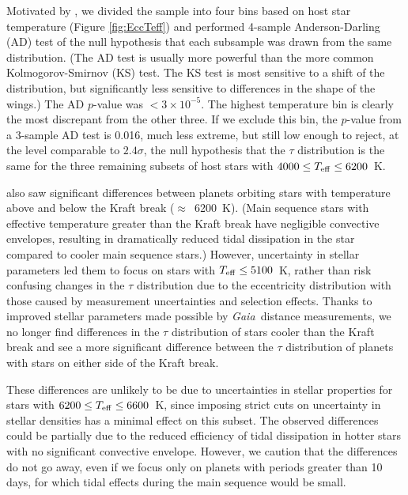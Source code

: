 \documentclass{aastex62}
\newcommand{\gaia}{{\it Gaia~}}
\begin{document}
Motivated by \citet{Moorhead:2011}, we divided the sample into four bins based on host star temperature (Figure \ref{fig:EccTeff}) and performed 4-sample Anderson-Darling (AD) test of the null hypothesis that each subsample was drawn from the same distribution.  
(The AD test is usually more powerful than the more common Kolmogorov-Smirnov (KS) test.  The KS test is most sensitive to a shift of the distribution, but significantly less sensitive to differences in the shape of the wings.)  The AD $p$-value was $<3\times10^{-5}$.   The highest temperature bin is clearly the most discrepant from the other three.  If we exclude this bin,  the $p$-value from a 3-sample AD test is 0.016, much less extreme, but still low enough to reject, at the level comparable to $2.4 \sigma$, the null hypothesis that the $\tau$ distribution is the same for the three remaining subsets of host stars with $4000 \le T_{\rm eff} \le 6200$~K.  

\citet{Moorhead:2011} also saw significant differences between planets orbiting stars with temperature above and below the Kraft break ($\approx$~6200~K).
{(Main sequence stars with effective temperature greater than the Kraft break have negligible convective envelopes, resulting in dramatically reduced tidal dissipation in the star compared to cooler main sequence stars.)}
However, uncertainty in stellar parameters led them to focus on stars with $T_{\rm eff} \le 5100$~K, rather than risk confusing changes in the $\tau$ distribution due to the eccentricity distribution with those caused by measurement uncertainties and selection effects. 
Thanks to improved stellar parameters made possible by \gaia distance measurements, we no longer find differences in the $\tau$ distribution of stars cooler than the Kraft break and see a more significant difference between the $\tau$ distribution of planets with stars on either side of the Kraft break.  

These differences are unlikely to be due to uncertainties in stellar properties for stars with $6200 \le T_{\rm eff} \le 6600$~K, since imposing strict cuts on uncertainty in stellar densities has a minimal effect on this subset.
The observed differences could be partially due to the reduced efficiency of tidal dissipation in hotter stars with no significant convective envelope.  
However, we caution that the differences do not go away, even if we focus only on planets with periods greater than 10 days, for which tidal effects during the main sequence would be small.

\end{document}

